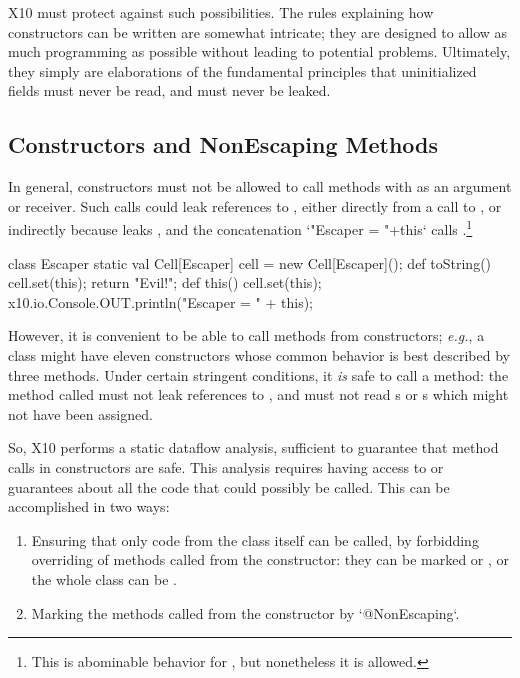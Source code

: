 X10 must protect against such possibilities.  The rules explaining how
constructors can be written are somewhat intricate; they are designed to allow
as much programming as possible without leading to potential problems.
Ultimately, they simply are elaborations of the fundamental principles that
uninitialized fields must never be read, and  must never be leaked.


\subsection{Constructors and NonEscaping Methods}

In general, constructors must not be allowed to call methods with as
an argument or receiver. Such calls could leak references to ,
either directly from a call to , or indirectly because
 leaks , and the concatenation
\Xcd`"Escaper = "+this` calls .\footnote{This is abominable behavior for
, but nonetheless it is allowed.}
\begin{xten}
class Escaper {
  static val Cell[Escaper] cell = new Cell[Escaper]();
  def toString() {
    cell.set(this);
    return "Evil!";
  }
  def this() {
    cell.set(this);
    x10.io.Console.OUT.println("Escaper = " + this);
  }
}
\end{xten}
%

However, it is convenient to be able to call methods from constructors; {\em
e.g.}, a class might have eleven constructors whose common behavior is best
described by three methods.
Under certain stringent conditions, it {\em is}
safe to call a method: the method called must not leak references to
, and must not read s or s which might not have
been assigned.

So, X10 performs a static dataflow analysis, sufficient to guarantee that
method calls in constructors are safe.  This analysis requires having access
to or guarantees about all the code that could possibly be called.  This can
be accomplished in two ways:
\begin{enumerate}
\item Ensuring that only code from the class itself can be called, by
      forbidding overriding of
      methods called from the constructor: they can be marked  or
      , or the whole class can be .
\item Marking the methods called from the constructor by
      \xcd`@NonEscaping`.
\end{enumerate}

